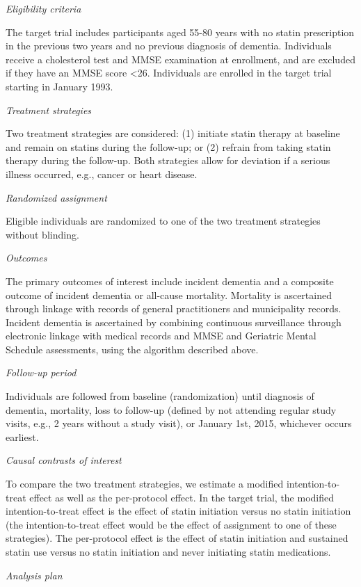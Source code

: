 \documentclass[
]{book}
\begin{document}
\emph{Eligibility criteria}

The target trial includes participants aged 55-80 years with no statin prescription in the previous two years and no previous diagnosis of dementia. Individuals receive a cholesterol test and MMSE examination at enrollment, and are excluded if they have an MMSE score \textless26. Individuals are enrolled in the target trial starting in January 1993.

\emph{Treatment strategies}

Two treatment strategies are considered: (1) initiate statin therapy at baseline and remain on statins during the follow-up; or (2) refrain from taking statin therapy during the follow-up. Both strategies allow for deviation if a serious illness occurred, e.g., cancer or heart disease.

\emph{Randomized assignment}

Eligible individuals are randomized to one of the two treatment strategies without blinding.

\emph{Outcomes}

The primary outcomes of interest include incident dementia and a composite outcome of incident dementia or all-cause mortality. Mortality is ascertained through linkage with records of general practitioners and municipality records. Incident dementia is ascertained by combining continuous surveillance through electronic linkage with medical records and MMSE and Geriatric Mental Schedule assessments, using the algorithm described above.

\emph{Follow-up period}

Individuals are followed from baseline (randomization) until diagnosis of dementia, mortality, loss to follow-up (defined by not attending regular study visits, e.g., 2 years without a study visit), or January 1st, 2015, whichever occurs earliest.

\emph{Causal contrasts of interest}

To compare the two treatment strategies, we estimate a modified intention-to-treat effect as well as the per-protocol effect. In the target trial, the modified intention-to-treat effect is the effect of statin initiation versus no statin initiation (the intention-to-treat effect would be the effect of assignment to one of these strategies). The per-protocol effect is the effect of statin initiation and
sustained statin use versus no statin initiation and never initiating statin medications.

\emph{Analysis plan}
\end{document}
